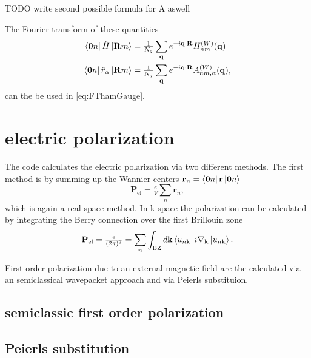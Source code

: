 \documentclass{scrreprt}
\begin{document}
TODO write second possible formula for A aswell

The Fourier transform of these quantities 
\begin{align}
  \bra{\mathbf{0}n} \hat{H}  \ket{\mathbf{R}m} &= \tfrac{1}{N_q} \sum_\mathbf{q} e^{-i \mathbf{q} \cdot \mathbf{R} } H^{(W)}_{nm}(\mathbf{q}) \\
  \bra{\mathbf{0}n} \hat{r}_\alpha  \ket{\mathbf{R}m} &= \tfrac{1}{N_q} \sum_\mathbf{q} e^{-i \mathbf{q} \cdot \mathbf{R} } A^{(W)}_{nm,\alpha}(\mathbf{q}),
\end{align}
can the be used in \ref{eq:FThamGauge}.





\newpage
\section{electric polarization}
The code calculates the electric polarization via two different methods.
The first method is by summing up the Wannier centers $\mathbf{r}_n = \bra{\mathbf{0}n} \mathbf{r}  \ket{\mathbf{0}n} $ \cite{todo}
\begin{equation}
  \mathbf{P}_{\text{el}} = \tfrac{e}{V} \sum_n \mathbf{r}_n,
\end{equation}
which is again a real space method. In k space the polarization can be calculated by integrating the Berry connection over the first Brillouin zone \cite{todo2}
\begin{equation}
  \mathbf{P}_{\text{el}} = \tfrac{e}{(2\pi)^2} = \sum_n \int_{\text{BZ}} d\mathbf{k} \bra{u_{n\mathbf{k}} } i \nabla_{\mathbf{k}} \ket{u_{n\mathbf{k}} }.
\end{equation}

First order polarization due to an external magnetic field are the calculated via an semiclassical wavepacket approach and via Peierls substituion.
\subsection{semiclassic first order polarization}


\subsection{Peierls substitution}
























\end{document}
